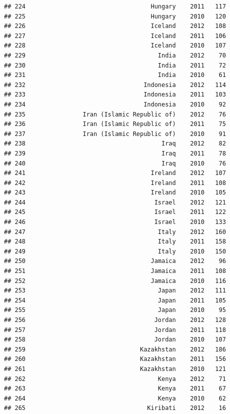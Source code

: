 \documentclass[
]{book}
\begin{document}
\begin{verbatim}
## 224                                   Hungary    2011   117
## 225                                   Hungary    2010   120
## 226                                   Iceland    2012   108
## 227                                   Iceland    2011   106
## 228                                   Iceland    2010   107
## 229                                     India    2012    70
## 230                                     India    2011    72
## 231                                     India    2010    61
## 232                                 Indonesia    2012   114
## 233                                 Indonesia    2011   103
## 234                                 Indonesia    2010    92
## 235                Iran (Islamic Republic of)    2012    76
## 236                Iran (Islamic Republic of)    2011    75
## 237                Iran (Islamic Republic of)    2010    91
## 238                                      Iraq    2012    82
## 239                                      Iraq    2011    78
## 240                                      Iraq    2010    76
## 241                                   Ireland    2012   107
## 242                                   Ireland    2011   108
## 243                                   Ireland    2010   105
## 244                                    Israel    2012   121
## 245                                    Israel    2011   122
## 246                                    Israel    2010   133
## 247                                     Italy    2012   160
## 248                                     Italy    2011   158
## 249                                     Italy    2010   150
## 250                                   Jamaica    2012    96
## 251                                   Jamaica    2011   108
## 252                                   Jamaica    2010   116
## 253                                     Japan    2012   111
## 254                                     Japan    2011   105
## 255                                     Japan    2010    95
## 256                                    Jordan    2012   128
## 257                                    Jordan    2011   118
## 258                                    Jordan    2010   107
## 259                                Kazakhstan    2012   186
## 260                                Kazakhstan    2011   156
## 261                                Kazakhstan    2010   121
## 262                                     Kenya    2012    71
## 263                                     Kenya    2011    67
## 264                                     Kenya    2010    62
## 265                                  Kiribati    2012    16

\end{verbatim}
\end{document}
